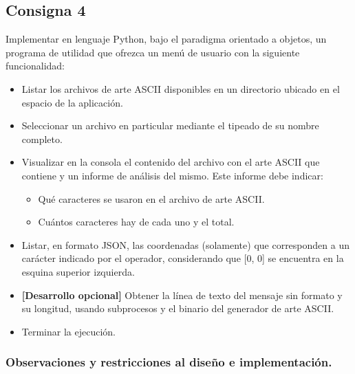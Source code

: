 \documentclass[a4paper,12pt]{article}
\begin{document}
\subsection{Consigna 4}
Implementar en lenguaje Python, bajo el paradigma orientado a objetos, un programa de utilidad que ofrezca un menú de usuario con la siguiente funcionalidad:
\begin{itemize}
    \item Listar los archivos de arte ASCII disponibles en un directorio ubicado en el espacio de la aplicación.
    \item Seleccionar un archivo en particular mediante el tipeado de su nombre completo.
    \item Visualizar en la consola el contenido del archivo con el arte ASCII que contiene y un informe de análisis del mismo. Este informe debe indicar:
    \begin{itemize}
        \item Qué caracteres se usaron en el archivo de arte ASCII.
        \item Cuántos caracteres hay de cada uno y el total.
    \end{itemize}
    \item Listar, en formato JSON, las coordenadas (solamente) que corresponden a un carácter indicado por el operador, considerando que [0, 0] se encuentra en la esquina superior izquierda.
    \item \textbf{[Desarrollo opcional]} Obtener la línea de texto del mensaje sin formato y su longitud, usando subprocesos y el binario del generador de arte ASCII.
    \item Terminar la ejecución.
\end{itemize}
\subsubsection{Observaciones y restricciones al diseño e implementación.}
\end{document}
